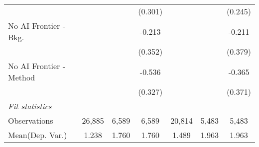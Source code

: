 \begin{tabular}{lcccccc}
                           &             &         & (0.301) &              &              & (0.245)\\   
   No AI Frontier - Bkg.   &             &         & -0.213  &              &              & -0.211\\   
                           &             &         & (0.352) &              &              & (0.379)\\   
   No AI Frontier - Method &             &         & -0.536  &              &              & -0.365\\   
                           &             &         & (0.327) &              &              & (0.371)\\   
   \midrule
   \emph{Fit statistics}\\
   Observations            & 26,885      & 6,589   & 6,589   & 20,814       & 5,483        & 5,483\\  
Mean(Dep. Var.) & 1.238 & 1.760 & 1.760 & 1.489 & 1.963 & 1.963 \\
   

\end{tabular}
